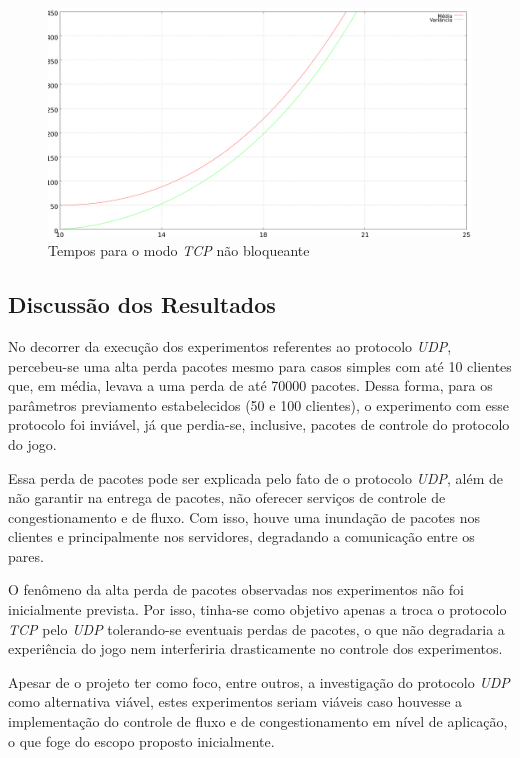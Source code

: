 \documentclass[12pt]{article}
\begin{document}
\begin{figure}[ht]
  \centering
  \includegraphics[width=1\textwidth]{img/tcp-graph.png}
  \caption{Tempos para o modo \emph{TCP} não bloqueante}
  \label{fig:tcp-graph}
\end{figure}

\subsection{Discussão dos Resultados} \label{sub:discussao}

No decorrer da execução dos experimentos referentes ao protocolo \emph{UDP}, percebeu-se uma alta perda pacotes mesmo para casos simples com até 10 clientes que, em média, levava a uma perda de até 70000 pacotes. Dessa forma, para os parâmetros previamento estabelecidos (50 e 100 clientes), o experimento com esse protocolo foi inviável, já que perdia-se, inclusive, pacotes de controle do protocolo do jogo. 

Essa perda de pacotes pode ser explicada pelo fato de o protocolo \emph{UDP}, além de não garantir na entrega de pacotes, não oferecer serviços de controle de congestionamento e de fluxo. Com isso, houve uma inundação de pacotes nos clientes e principalmente nos servidores, degradando a comunicação entre os pares.

O fenômeno da alta perda de pacotes observadas nos experimentos não foi inicialmente prevista. Por isso, tinha-se como objetivo apenas a troca o protocolo \emph{TCP} pelo \emph{UDP} tolerando-se eventuais perdas de pacotes, o que não degradaria a experiência do jogo nem interferiria drasticamente no controle dos experimentos.

Apesar de o projeto ter como foco, entre outros, a investigação do protocolo \emph{UDP} como alternativa viável, estes experimentos seriam viáveis caso houvesse a implementação do controle de fluxo e de congestionamento em nível de aplicação, o que foge do escopo proposto inicialmente.
\end{document}
